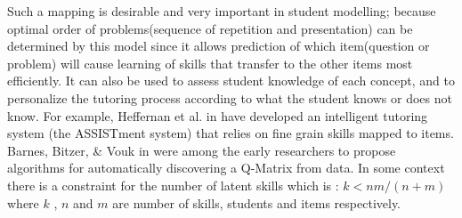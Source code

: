 Such a mapping is desirable and very important in student modelling; because optimal order of problems(sequence of repetition and presentation) can be determined by this model since it allows prediction of which item(question or problem) will cause learning of skills that transfer to the other items most efficiently. It can also be used to assess student knowledge of each concept, and to personalize the tutoring process according to what the student knows or does not know.  For example, Heffernan et al. in \citep{feng2009using} have developed an intelligent tutoring system (the ASSISTment system) that relies on fine grain skills mapped to items.  Barnes, Bitzer, \& Vouk in \citep{barnes2005experimental} were among the early researchers to propose algorithms for automatically discovering a Q-Matrix from data. In some context there is a constraint for the number of latent skills which is : $k<nm/(n+m)$ \protect\citep{lee1999learning} where $k$ , $n$ and $m$ are number of skills, students and items respectively.
  

